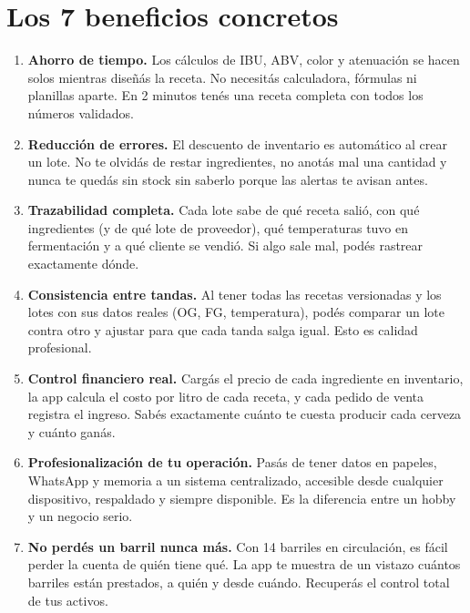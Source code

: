 \documentclass[11pt,a4paper]{report}
\begin{document}
\section{Los 7 beneficios concretos}

\begin{enumerate}[leftmargin=*, itemsep=6pt]

  \item \textbf{Ahorro de tiempo.}
  Los cálculos de IBU, ABV, color y atenuación se hacen solos mientras diseñás la receta. No necesitás calculadora, fórmulas ni planillas aparte. En 2 minutos tenés una receta completa con todos los números validados.

  \item \textbf{Reducción de errores.}
  El descuento de inventario es automático al crear un lote. No te olvidás de restar ingredientes, no anotás mal una cantidad y nunca te quedás sin stock sin saberlo porque las alertas te avisan antes.

  \item \textbf{Trazabilidad completa.}
  Cada lote sabe de qué receta salió, con qué ingredientes (y de qué lote de proveedor), qué temperaturas tuvo en fermentación y a qué cliente se vendió. Si algo sale mal, podés rastrear exactamente dónde.

  \item \textbf{Consistencia entre tandas.}
  Al tener todas las recetas versionadas y los lotes con sus datos reales (OG, FG, temperatura), podés comparar un lote contra otro y ajustar para que cada tanda salga igual. Esto es calidad profesional.

  \item \textbf{Control financiero real.}
  Cargás el precio de cada ingrediente en inventario, la app calcula el costo por litro de cada receta, y cada pedido de venta registra el ingreso. Sabés exactamente cuánto te cuesta producir cada cerveza y cuánto ganás.

  \item \textbf{Profesionalización de tu operación.}
  Pasás de tener datos en papeles, WhatsApp y memoria a un sistema centralizado, accesible desde cualquier dispositivo, respaldado y siempre disponible. Es la diferencia entre un hobby y un negocio serio.

  \item \textbf{No perdés un barril nunca más.}
  Con 14 barriles en circulación, es fácil perder la cuenta de quién tiene qué. La app te muestra de un vistazo cuántos barriles están prestados, a quién y desde cuándo. Recuperás el control total de tus activos.

\end{enumerate}
\end{document}
